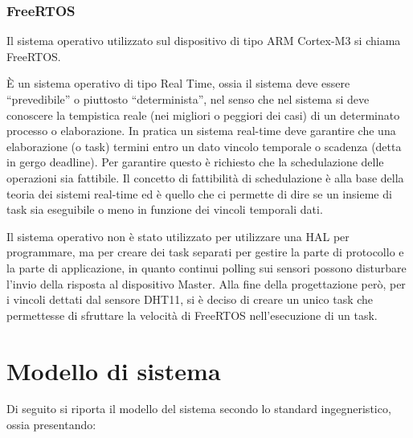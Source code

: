 \documentclass[a4paper,titlepage]{book}
\begin{document}
\subsection{FreeRTOS}

Il sistema operativo utilizzato sul dispositivo di tipo ARM Cortex-M3 si chiama FreeRTOS. 

È un sistema operativo di tipo Real Time, ossia  il sistema deve essere ``prevedibile'' o piuttosto ``determinista'', nel senso che nel sistema si deve conoscere la tempistica reale (nei migliori o peggiori dei casi) di un determinato processo o elaborazione. In pratica un sistema real-time deve garantire che una elaborazione (o task) termini entro un dato vincolo temporale o scadenza (detta in gergo deadline). Per garantire questo è richiesto che la schedulazione delle operazioni sia fattibile. Il concetto di fattibilità di schedulazione è alla base della teoria dei sistemi real-time ed è quello che ci permette di dire se un insieme di task sia eseguibile o meno in funzione dei vincoli temporali dati.

Il sistema operativo non è stato utilizzato per utilizzare una HAL per programmare, ma per creare dei task separati per gestire la parte di protocollo e la parte di applicazione, in quanto continui polling sui sensori possono disturbare l'invio della risposta al dispositivo Master. Alla fine della progettazione però, per i vincoli dettati dal sensore DHT11, si è deciso di creare un unico task che permettesse di sfruttare la velocità di FreeRTOS nell'esecuzione di un task.




\chapter{Modello di sistema}

Di seguito si riporta il modello del sistema secondo lo standard ingegneristico, ossia presentando:
\end{document}
